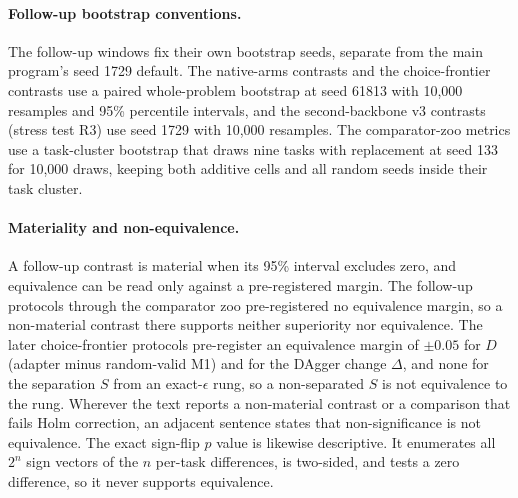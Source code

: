 \paragraph{Follow-up bootstrap conventions.}
The follow-up windows fix their own bootstrap seeds, separate from the main program's seed 1729 default. The native-arms contrasts and the choice-frontier contrasts use a paired whole-problem bootstrap at seed 61813 with 10,000 resamples and 95\% percentile intervals, and the second-backbone v3 contrasts (stress test R3) use seed 1729 with 10,000 resamples. The comparator-zoo metrics use a task-cluster bootstrap that draws nine tasks with replacement at seed 133 for 10,000 draws, keeping both additive cells and all random seeds inside their task cluster.

\paragraph{Materiality and non-equivalence.}
A follow-up contrast is material when its 95\% interval excludes zero, and equivalence can be read only against a pre-registered margin. The follow-up protocols through the comparator zoo pre-registered no equivalence margin, so a non-material contrast there supports neither superiority nor equivalence. The later choice-frontier protocols pre-register an equivalence margin of $\pm 0.05$ for $D$ (adapter minus random-valid M1) and for the DAgger change $\Delta$, and none for the separation $S$ from an exact-$\epsilon$ rung, so a non-separated $S$ is not equivalence to the rung. Wherever the text reports a non-material contrast or a comparison that fails Holm correction, an adjacent sentence states that non-significance is not equivalence.
The exact sign-flip $p$ value is likewise descriptive. It enumerates all $2^n$ sign vectors of the $n$ per-task differences, is two-sided, and tests a zero difference, so it never supports equivalence.

